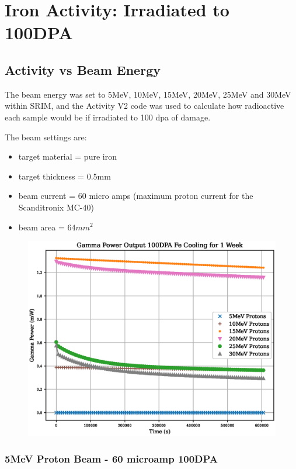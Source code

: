 \chapter{Iron Activity: Irradiated to 100DPA}
\label{chap:appendixironactivity}

\section{Activity vs Beam Energy}

The beam energy was set to 5MeV, 10MeV, 15MeV, 20MeV, 25MeV and 30MeV within SRIM, and the Activity V2 code was used to calculate how radioactive each sample would be if irradiated to 100 \acrshort{dpa} of damage.

The beam settings are:

\begin{itemize}
\item target material = pure iron
\item target thickness = 0.5mm
\item beam current = 60 micro amps (maximum proton current for the Scanditronix MC-40)
\item beam area = $64mm^2$
\end{itemize}



\begin{figure}[!htb]
\centering
\includegraphics[width=0.7\linewidth]{chapters/activity_code/fe_100dpa/cooling.eps}
\caption{}
\label{fig:100dpa-cooling}
\end{figure}



\clearpage
\FloatBarrier
\subsection{5MeV Proton Beam - 60 microamp 100DPA}

